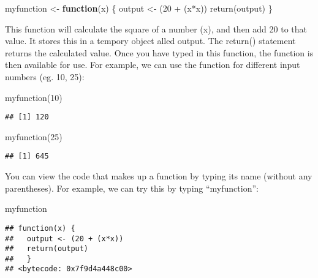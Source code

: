 \documentclass[
]{book}
\newenvironment{Shaded}{\begin{snugshade}}{\end{snugshade}}
\newcommand{\ControlFlowTok}[1]{\textcolor[rgb]{0.13,0.29,0.53}{\textbf{#1}}}
\newcommand{\DecValTok}[1]{\textcolor[rgb]{0.00,0.00,0.81}{#1}}
\newcommand{\FunctionTok}[1]{\textcolor[rgb]{0.00,0.00,0.00}{#1}}
\newcommand{\NormalTok}[1]{#1}
\newcommand{\OtherTok}[1]{\textcolor[rgb]{0.56,0.35,0.01}{#1}}
\newcommand{\SpecialCharTok}[1]{\textcolor[rgb]{0.00,0.00,0.00}{#1}}
\begin{document}
\begin{Shaded}
\begin{Highlighting}[]
\NormalTok{myfunction }\OtherTok{\textless{}{-}} \ControlFlowTok{function}\NormalTok{(x) \{ }
\NormalTok{  output }\OtherTok{\textless{}{-}}\NormalTok{ (}\DecValTok{20} \SpecialCharTok{+}\NormalTok{ (x}\SpecialCharTok{*}\NormalTok{x)) }
  \FunctionTok{return}\NormalTok{(output)}
\NormalTok{  \}}
\end{Highlighting}
\end{Shaded}

This function will calculate the square of a number (x), and then add 20 to that value. It stores this in a tempory object alled output. The return() statement returns the calculated value. Once you have typed in this function, the function is then available for use. For example, we can use the function for different input numbers (eg. 10, 25):

\begin{Shaded}
\begin{Highlighting}[]
\FunctionTok{myfunction}\NormalTok{(}\DecValTok{10}\NormalTok{)}
\end{Highlighting}
\end{Shaded}

\begin{verbatim}
## [1] 120
\end{verbatim}

\begin{Shaded}
\begin{Highlighting}[]
\FunctionTok{myfunction}\NormalTok{(}\DecValTok{25}\NormalTok{)}
\end{Highlighting}
\end{Shaded}

\begin{verbatim}
## [1] 645
\end{verbatim}

You can view the code that makes up a function by typing its name (without any parentheses). For example, we can try this by typing ``myfunction'':

\begin{Shaded}
\begin{Highlighting}[]
\NormalTok{myfunction}
\end{Highlighting}
\end{Shaded}

\begin{verbatim}
## function(x) { 
##   output <- (20 + (x*x)) 
##   return(output)
##   }
## <bytecode: 0x7f9d4a448c00>
\end{verbatim}
\end{document}
